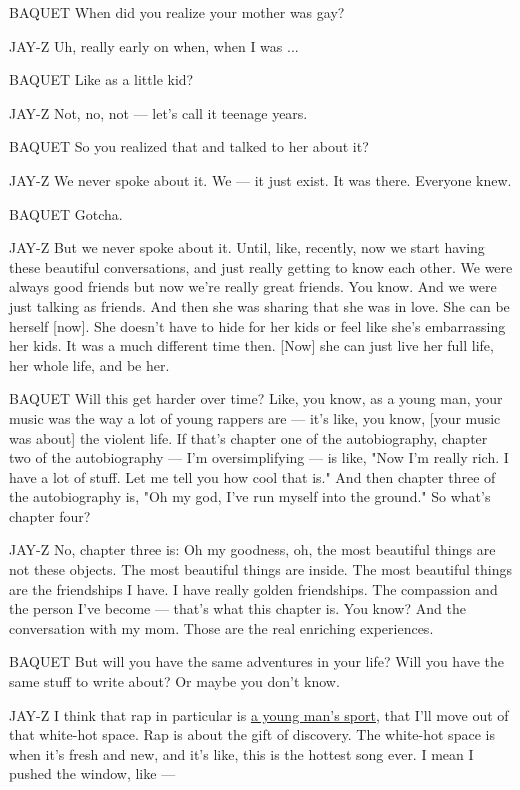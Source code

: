 BAQUET When did you realize your mother was gay?

JAY-Z Uh, really early on when, when I was ...

BAQUET Like as a little kid?

JAY-Z Not, no, not --- let's call it teenage years.

BAQUET So you realized that and talked to her about it?

JAY-Z We never spoke about it. We --- it just exist. It was there.
Everyone knew.

BAQUET Gotcha.

JAY-Z But we never spoke about it. Until, like, recently, now we start
having these beautiful conversations, and just really getting to know
each other. We were always good friends but now we're really great
friends. You know. And we were just talking as friends. And then she was
sharing that she was in love. She can be herself {[}now{]}. She doesn't
have to hide for her kids or feel like she's embarrassing her kids. It
was a much different time then. {[}Now{]} she can just live her full
life, her whole life, and be her.

BAQUET Will this get harder over time? Like, you know, as a young man,
your music was the way a lot of young rappers are --- it's like, you
know, {[}your music was about{]} the violent life. If that's chapter one
of the autobiography, chapter two of the autobiography --- I'm
oversimplifying --- is like, "Now I'm really rich. I have a lot of
stuff. Let me tell you how cool that is." And then chapter three of the
autobiography is, "Oh my god, I've run myself into the ground." So
what's chapter four?

JAY-Z No, chapter three is: Oh my goodness, oh, the most beautiful
things are not these objects. The most beautiful things are inside. The
most beautiful things are the friendships I have. I have really golden
friendships. The compassion and the person I've become --- that's what
this chapter is. You know? And the conversation with my mom. Those are
the real enriching experiences.

BAQUET But will you have the same adventures in your life? Will you have
the same stuff to write about? Or maybe you don't know.

JAY-Z I think that rap in particular is
\href{https://www.nytimes3xbfgragh.onion/2017/07/19/arts/music/jay-z-and-the-politics-of-rapping-in-middle-age.html}{a
young man's sport}, that I'll move out of that white-hot space. Rap is
about the gift of discovery. The white-hot space is when it's fresh and
new, and it's like, this is the hottest song ever. I mean I pushed the
window, like ---

